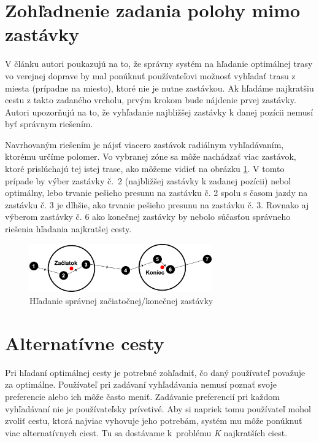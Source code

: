 \section{Zohľadnenie zadania polohy mimo zastávky}
\label{sec:actual-location}
V článku \cite{circular} autori poukazujú na to, že správny systém na hľadanie optimálnej trasy vo verejnej doprave by mal ponúknuť používateľovi možnosť vyhľadať trasu z miesta (prípadne na miesto), ktoré nie je nutne zastávkou. Ak hľadáme najkratšiu cestu z takto zadaného vrcholu, prvým krokom bude nájdenie prvej zastávky. Autori upozorňujú na to, že vyhľadanie najbližšej zastávky k danej pozícii nemusí byť správnym riešením.

Navrhovaným riešením je nájsť viacero zastávok radiálnym vyhľadávaním, ktorému určíme polomer. Vo vybranej zóne sa môže nachádzať viac zastávok, ktoré prislúchajú tej istej trase, ako môžeme vidieť na obrázku \ref{fig:circularRoute}. V tomto prípade by výber zastávky č.~2 (najbližšej zastávky k zadanej pozícii) nebol optimálny, lebo trvanie pešieho presunu na zastávku č. 2 spolu s časom jazdy na zastávku č. 3 je dlhšie, ako trvanie pešieho presunu na zastávku č. 3. Rovnako aj výberom zastávky č. 6 ako konečnej zastávky by nebolo súčasťou správneho riešenia hľadania najkratšej cesty. 

\begin{figure}[H]
\centerline{\includegraphics[width=0.7\textwidth]{images/circular-route}}
\caption[Hľadanie správnej začiatočnej/konečnej zastávky]{Hľadanie správnej začiatočnej/konečnej zastávky}
\label{fig:circularRoute}
\end{figure}

\section{Alternatívne cesty}
\label{sec:alternative-optimal-paths}
Pri hľadaní optimálnej cesty je potrebné zohľadniť, čo daný používateľ považuje za optimálne. Používateľ pri zadávaní vyhľadávania nemusí poznať svoje preferencie alebo ich môže často meniť. Zadávanie preferencií pri každom vyhľadávaní nie je používateľsky prívetivé. Aby si napriek tomu používateľ mohol zvoliť cestu, ktorá najviac vyhovuje jeho potrebám, systém mu môže ponúknuť viac alternatívnych ciest. Tu sa dostávame k~problému \textit{K} najkratších ciest.

